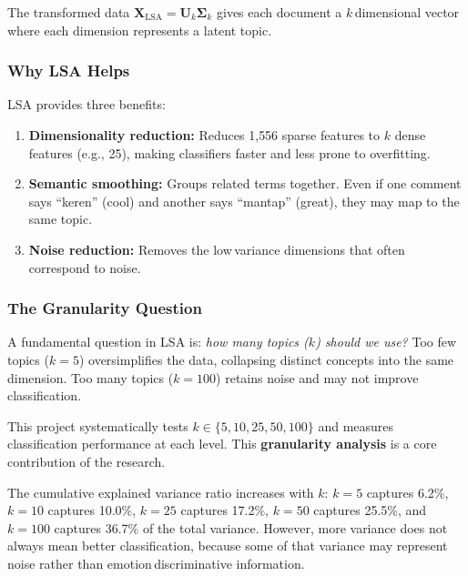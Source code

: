 \documentclass[12pt,a4paper,twoside]{article}
\theoremstyle{definition}
\begin{document}
The transformed data $\mathbf{X}_{\text{LSA}} = \mathbf{U}_k \boldsymbol{\Sigma}_k$ gives each document a $k$\,dimensional vector where each dimension represents a latent topic.

\subsubsection{Why LSA Helps}

LSA provides three benefits:
\begin{enumerate}[leftmargin=2em]
    \item \textbf{Dimensionality reduction:} Reduces 1{,}556 sparse features to $k$ dense features (e.g., 25), making classifiers faster and less prone to overfitting.
    \item \textbf{Semantic smoothing:} Groups related terms together. Even if one comment says ``keren'' (cool) and another says ``mantap'' (great), they may map to the same topic.
    \item \textbf{Noise reduction:} Removes the low\,variance dimensions that often correspond to noise.
\end{enumerate}

\subsubsection{The Granularity Question}

A fundamental question in LSA is: \textit{how many topics ($k$) should we use?} Too few topics ($k=5$) oversimplifies the data, collapsing distinct concepts into the same dimension. Too many topics ($k=100$) retains noise and may not improve classification.

This project systematically tests $k \in \{5, 10, 25, 50, 100\}$ and measures classification performance at each level. This \textbf{granularity analysis} is a core contribution of the research.

\begin{notebox}

The cumulative explained variance ratio increases with $k$: $k=5$ captures 6.2\%, $k=10$ captures 10.0\%, $k=25$ captures 17.2\%, $k=50$ captures 25.5\%, and $k=100$ captures 36.7\% of the total variance. However, more variance does not always mean better classification, because some of that variance may represent noise rather than emotion\,discriminative information.

\end{notebox}
\end{document}
